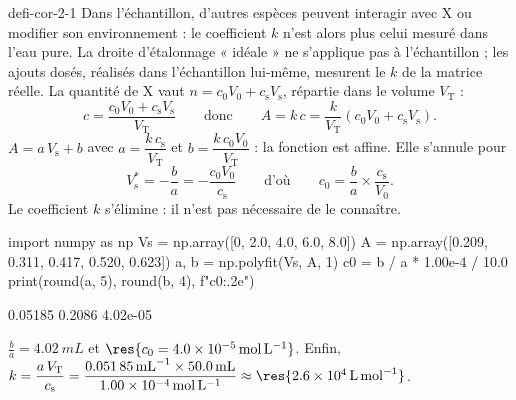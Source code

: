 \begin{blocEdition}{defi-cor-2-1}
Dans l'échantillon, d'autres espèces peuvent interagir avec X ou modifier son environnement : le coefficient $k$
n'est alors plus celui mesuré dans l'eau pure. La droite d'étalonnage « idéale » ne s'applique pas à l'échantillon ;
les ajouts dosés, réalisés dans l'échantillon lui-même, mesurent le $k$ de la matrice réelle.
La quantité de X vaut $n=c_0V_0+c_\mathrm{s}V_\mathrm{s}$, répartie dans le volume $V_\mathrm{T}$ :
\[c=\frac{c_0V_0+c_\mathrm{s}V_\mathrm{s}}{V_\mathrm{T}}\qquad\text{donc}\qquad
A=k\,c=\frac{k}{V_\mathrm{T}}\left(c_0V_0+c_\mathrm{s}V_\mathrm{s}\right).\]
$A=a\,V_\mathrm{s}+b$ avec $a=\dfrac{k\,c_\mathrm{s}}{V_\mathrm{T}}$ et $b=\dfrac{k\,c_0V_0}{V_\mathrm{T}}$ : la
fonction est affine. Elle s'annule pour
\[V_\mathrm{s}^{*}=-\frac{b}{a}=-\frac{c_0V_0}{c_\mathrm{s}}\qquad\text{d'où}\qquad c_0=\frac{b}{a}\times\frac{c_\mathrm{s}}{V_0}.\]
Le coefficient $k$ s'élimine : il n'est pas nécessaire de le connaître.
\begin{codecote}[0.62]
\begin{pythoncol}
import numpy as np
Vs = np.array([0, 2.0, 4.0, 6.0, 8.0])
A = np.array([0.209, 0.311, 0.417, 0.520, 0.623])
a, b = np.polyfit(Vs, A, 1)
c0 = b / a * 1.00e-4 / 10.0
print(round(a, 5), round(b, 4), f"{c0:.2e}")
\end{pythoncol}
\cote
\begin{consolecol}
0.05185 0.2086 4.02e-05
\end{consolecol}
\end{codecote}
$\frac{b}{a}=\qty{4,02}{mL}$ et $\res{c_0=\qty{4,0e-5}{mol.L^{-1}}}$. Enfin, $k=\dfrac{a\,V_\mathrm{T}}{c_\mathrm{s}}
=\dfrac{\qty{0,05185}{mL^{-1}}\times\qty{50,0}{mL}}{\qty{1,00e-4}{mol.L^{-1}}}\approx\res{\qty{2,6e4}{L.mol^{-1}}}$.
\end{blocEdition}

